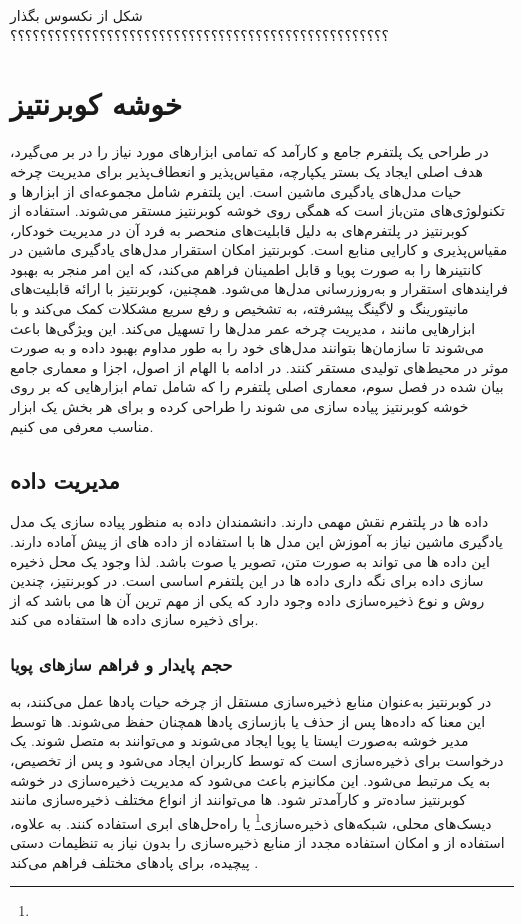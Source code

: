 شکل از نکسوس بگذار ؟؟؟؟؟؟؟؟؟؟؟؟؟؟؟؟؟؟؟؟؟؟؟؟؟؟؟؟؟؟؟؟؟؟؟؟؟؟؟؟؟؟؟؟؟؟؟؟؟؟؟

\section{خوشه کوبرنتیز}
در طراحی یک پلتفرم  جامع و کارآمد که تمامی ابزارهای مورد نیاز را در بر می‌گیرد، هدف اصلی ایجاد یک بستر یکپارچه، مقیاس‌پذیر و انعطاف‌پذیر برای مدیریت چرخه حیات مدل‌های یادگیری ماشین است. این پلتفرم شامل مجموعه‌ای از ابزارها و تکنولوژی‌های متن‌باز است که همگی روی خوشه کوبرنتیز مستقر می‌شوند. استفاده از کوبرنتیز در پلتفرم‌های  به دلیل قابلیت‌های منحصر به فرد آن در مدیریت خودکار، مقیاس‌پذیری و کارایی منابع است. کوبرنتیز امکان استقرار مدل‌های یادگیری ماشین در کانتینرها را به صورت پویا و قابل اطمینان فراهم می‌کند، که این امر منجر به بهبود فرایندهای استقرار و به‌روزرسانی مدل‌ها می‌شود. همچنین، کوبرنتیز با ارائه قابلیت‌های مانیتورینگ و لاگینگ پیشرفته، به تشخیص و رفع سریع مشکلات کمک می‌کند و با ابزارهایی مانند ، مدیریت چرخه عمر مدل‌ها را تسهیل می‌کند. این ویژگی‌ها باعث می‌شوند تا سازمان‌ها بتوانند مدل‌های خود را به طور مداوم بهبود داده و به صورت موثر در محیط‌های تولیدی مستقر کنند. در ادامه با الهام از اصول، اجزا و معماری جامع بیان شده در فصل سوم، معماری اصلی پلتفرم  را که شامل تمام ابزارهایی که بر روی خوشه کوبرنتیز پیاده سازی می شوند را طراحی کرده و برای هر بخش یک ابزار مناسب معرفی می کنیم.

\subsection{مدیریت داده}
داده ها در پلتفرم  نقش مهمی دارند. دانشمندان داده به منظور پیاده سازی یک مدل یادگیری ماشین نیاز به آموزش این مدل ها با استفاده از داده های از پیش آماده دارند. این داده ها می تواند به صورت متن، تصویر یا صوت باشد. لذا وجود یک محل ذخیره سازی داده برای نگه داری داده ها در این پلتفرم اساسی است. در کوبرنتیز، چندین روش و نوع ذخیره‌سازی داده وجود دارد که یکی از مهم ترین آن ها  می باشد که از  برای ذخیره سازی داده ها استفاده می کند.
 
\subsubsection{حجم پایدار و فراهم سازهای پویا}
در کوبرنتیز  به‌عنوان منابع ذخیره‌سازی مستقل از چرخه حیات پادها عمل می‌کنند، به این معنا که داده‌ها پس از حذف یا بازسازی پادها همچنان حفظ می‌شوند. ها توسط مدیر خوشه به‌صورت ایستا یا پویا ایجاد می‌شوند و می‌توانند به  متصل شوند.  یک درخواست برای ذخیره‌سازی است که توسط کاربران ایجاد می‌شود و پس از تخصیص، به یک  مرتبط می‌شود. این مکانیزم باعث می‌شود که مدیریت ذخیره‌سازی در خوشه کوبرنتیز ساده‌تر و کارآمدتر شود. ها می‌توانند از انواع مختلف ذخیره‌سازی مانند دیسک‌های محلی، شبکه‌های ذخیره‌سازی\footnote{} یا راه‌حل‌های ابری استفاده کنند. به علاوه، استفاده از  و  امکان استفاده مجدد از منابع ذخیره‌سازی را بدون نیاز به تنظیمات دستی پیچیده، برای پادهای مختلف فراهم می‌کند \cite{Kubernetes1, Kubernetes2}.


